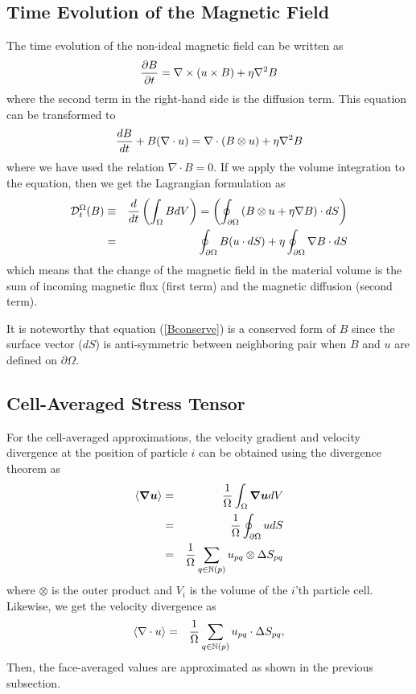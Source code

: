 \documentclass[twocolumn]{aastex63}
\newcommand{\vel}{{u}}
\newcommand{\surf}[0]{S}
\newcommand{\gradT}[1]{\boldsymbol{\nabla#1}}
\begin{document}
\subsection{Time Evolution of the Magnetic Field}
The time evolution of the non-ideal magnetic field can be written as
\begin{equation}
	{\partial B\over \partial t} = \nabla\times \left( \vel\times B\right)  + \eta \nabla^2B
\end{equation}
where the second term in the right-hand side is the diffusion term. This equation can be transformed to
\begin{equation}
	{d B\over dt} + B (\nabla\cdot u) = \nabla\cdot ( B\otimes \vel) + \eta \nabla^2B
\end{equation}
where we have used the relation $\nabla\cdot B=0$.
If we apply the volume integration to the equation, then we get the Lagrangian formulation as
\begin{eqnarray} \nonumber
	\mathcal{D}_t^\Omega(B) &\equiv& {d \over dt} \left(\int_\Omega B d V\right)= \left(\oint_{\partial\Omega} \left(B\otimes \vel  +\eta\nabla B\right)\cdot dS \right) \\
	&=& \oint_{\partial\Omega} B (u\cdot dS) + \eta\oint_{\partial\Omega}\nabla B\cdot dS \label{Bconserve}
\end{eqnarray}
which means that the change of the magnetic field in the material volume is the sum of incoming magnetic flux (first term) and the magnetic diffusion (second term).

It is noteworthy that equation (\ref{Bconserve}) is a conserved form of $B$ since the surface vector ($dS$) is anti-symmetric between neighboring pair when $B$ and $\vel$ are defined on $\partial\Omega$.

  




\subsection{Cell-Averaged Stress Tensor}

For the cell-averaged approximations, the velocity gradient and velocity divergence at the position of particle $i$ can be obtained using the divergence theorem as
\begin{eqnarray}
	\left<\gradT{u}\right> &=& {1\over \Omega} \int_\Omega \gradT{u} dV \\ 
	&=& {1\over \Omega} \oint_{\partial\Omega} \vel d\surf \\
	&=&{1\over \Omega} \sum_{q\in \mathbb{N}(p)} \vel_{pq}\otimes \Delta \surf_{pq} \\
	\end{eqnarray}	
	where $\otimes$ is the outer product and $V_i$ is the volume of the $i$'th particle cell.
Likewise, we get the velocity divergence as
	\begin{eqnarray}
	\left<\nabla\cdot\vel\right> &=& {1\over \Omega}\sum_{q\in\mathbb{N}(p)} \vel_{pq}\cdot \Delta \surf_{pq},
\end{eqnarray}	
 Then, the face-averaged values are approximated as shown in the previous subsection.
\end{document}
